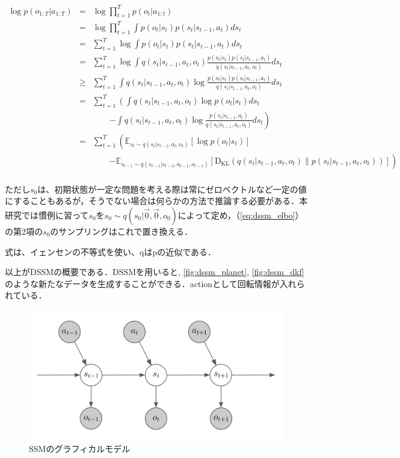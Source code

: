\begin{eqnarray}
  \log p(o_{1:T}|a_{1:T})
  &=& \log \prod_{t=1}^T p(o_t|a_{1:t}) \nonumber \\
  &=& \log \prod_{t=1}^T \int p(o_t|s_t) p(s_t|s_{t-1}, a_t)ds_t \nonumber \\
  &=& \sum_{t=1}^T \log \int p(o_t|s_t) p(s_t|s_{t-1}, a_t)ds_t \nonumber \\
  &=& \sum_{t=1}^T \log \int q(s_t|s_{t-1}, a_t, o_t) \frac{p(o_t|s_t) p(s_t|s_{t-1}, a_t)}{q(s_t|s_{t-1}, a_t, o_t)}ds_t \nonumber \\
  &\geq& \sum_{t=1}^T \int q(s_t|s_{t-1}, a_t, o_t) \log \frac{p(o_t|s_t) p(s_t|s_{t-1}, a_t)}{q(s_t|s_{t-1}, a_t, o_t)}ds_t \nonumber \\
  &=& \sum_{t=1}^T \left( \int q(s_t|s_{t-1}, a_t, o_t) \log p(o_t|s_t)ds_t \right. \nonumber \\
  && \hspace{2em} \left. - \int q(s_t|s_{t-1}, a_t, o_t) \log \frac{p(s_t|s_{t-1}, a_t)}{q(s_t|s_{t-1}, a_t, o_t)}ds_t \right) \nonumber \\
  &=& \sum_{t=1}^T \left( \mathbb{E}_{s_t \sim q(s_t|s_{t-1}, a_t, o_t)} [\log p(o_t|s_t)] \right. \nonumber \\
  && \hspace{2em} \left. - \mathbb{E}_{s_{t-1} \sim q(s_{t-1}|s_{t-2}, a_{t-1}, o_{t-1})} [\mathrm{D_{KL}}(q(s_t|s_{t-1}, a_t, o_t) \| p(s_t|s_{t-1}, a_t, o_t))] \right)  \nonumber \\
  \label{eq:dssm_elbo}
\end{eqnarray}

ただし$s_0$は、初期状態が一定な問題を考える際は常にゼロベクトルなど一定の値にすることもあるが，そうでない場合は何らかの方法で推論する必要がある．本研究では慣例に習って$s_0$を$s_0 \sim q(s_0|\vec{0}, \vec{0}, o_0) $によって定め，（\ref{eq:dssm_elbo}）の第2項の$s_0$のサンプリングはこれで置き換える．

式は、イェンセンの不等式を使い、qはpの近似である．

以上がDSSMの概要である．DSSMを用いると, \ref{fig:dssm_planet}, \ref{fig:dssm_dkf}のような新たなデータを生成することができる．actionとして回転情報が入れられている．

\begin{figure}[tbp]
  \begin{center}
    \includegraphics[width=\linewidth]{./figures/dssm.png}
    \caption{SSMのグラフィカルモデル}
    \label{fig:ssm}
  \end{center}
\end{figure}

